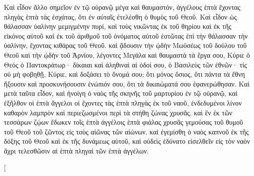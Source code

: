 \begin{pages}
    \begin{Rightside}
        \beginnumbering
		Καὶ εἶδον ἄλλο σημεῖον ἐν τῷ οὐρανῷ μέγα καὶ θαυμαστόν, ἀγγέλους ἑπτὰ ἔχοντας πληγὰς ἑπτὰ τὰς ἐσχάτας, ὅτι ἐν αὐταῖς ἐτελέσθη ὁ θυμὸς τοῦ Θεοῦ. Καὶ εἶδον ὡς θάλασσαν ὑαλίνην μεμιγμένην πυρί, καὶ τοὺς νικῶντας ἐκ τοῦ θηρίου καὶ ἐκ τῆς εἰκόνος αὐτοῦ καὶ ἐκ τοῦ ἀριθμοῦ τοῦ ὀνόματος αὐτοῦ ἑστῶτας ἐπὶ τὴν θάλασσαν τὴν ὑαλίνην, ἔχοντας κιθάρας τοῦ Θεοῦ. 
		\pend
		\pstart
		καὶ ᾄδουσιν τὴν ᾠδὴν Μωϋσέως τοῦ δούλου τοῦ Θεοῦ καὶ τὴν ᾠδὴν τοῦ Ἀρνίου, λέγοντες 	Μεγάλα καὶ θαυμαστὰ τὰ ἔργα σου, Κύριε ὁ Θεός ὁ Παντοκράτωρ· δίκαιαι καὶ ἀληθιναὶ αἱ ὁδοί σου, ὁ Βασιλεὺς τῶν ἐθνῶν· τίς οὐ μὴ φοβηθῇ, Κύριε, καὶ δοξάσει τὸ ὄνομά σου; ὅτι μόνος ὅσιος, ὅτι πάντα τὰ ἔθνη ἥξουσιν καὶ προσκυνήσουσιν ἐνώπιόν σου, ὅτι τὰ δικαιώματά σου ἐφανερώθησαν. 
		\pend
		\pstart
		Καὶ μετὰ ταῦτα εἶδον, καὶ ἠνοίγη ὁ ναὸς τῆς σκηνῆς τοῦ μαρτυρίου ἐν τῷ οὐρανῷ, καὶ ἐξῆλθον οἱ ἑπτὰ ἄγγελοι οἱ ἔχοντες τὰς ἑπτὰ πληγὰς ἐκ τοῦ ναοῦ, ἐνδεδυμένοι λίνον καθαρὸν λαμπρὸν καὶ περιεζωσμένοι περὶ τὰ στήθη ζώνας χρυσᾶς. καὶ ἓν ἐκ τῶν τεσσάρων ζῴων ἔδωκεν τοῖς ἑπτὰ ἀγγέλοις ἑπτὰ φιάλας χρυσᾶς γεμούσας τοῦ θυμοῦ τοῦ Θεοῦ τοῦ ζῶντος εἰς τοὺς αἰῶνας τῶν αἰώνων. καὶ ἐγεμίσθη ὁ ναὸς καπνοῦ ἐκ τῆς δόξης τοῦ Θεοῦ καὶ ἐκ τῆς δυνάμεως αὐτοῦ, καὶ οὐδεὶς ἐδύνατο εἰσελθεῖν εἰς τὸν ναὸν ἄχρι τελεσθῶσιν αἱ ἑπτὰ πληγαὶ τῶν ἑπτὰ ἀγγέλων.
		\pend
        \endnumbering
    \end{Rightside}
    \begin{Leftside}
        \beginnumbering
        \pstart[

\end{Leftside}
\end{pages}
